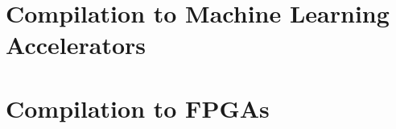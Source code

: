 \documentclass[12pt, hidelinks]{book}
\begin{document}
\begin{spacing}{1.5}
  \tableofcontents
\end{spacing}

\pagestyle{headings}
\setcounter{page}{1}
\renewcommand{\chaptermark}[1]{\markboth{\sc{\chaptername\ \thechapter.\ #1}}{}}
\renewcommand{\sectionmark}[1]{\markright{\sc{\thesection.\ #1}}{}}



\printnoidxglossaries


\part{Compilation to Machine Learning Accelerators}
\label{part:glenside-and-3la}






\part{Compilation to FPGAs}
\label{part:lakeroad}





\clearpage
{}
\singlespacing


\end{document}
